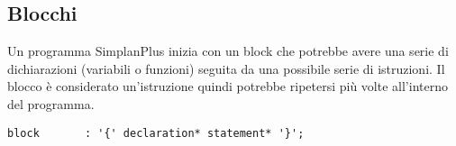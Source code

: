\documentclass[../../main]{subfiles}
\begin{document}
\subsection{Blocchi}\label{s:blocchi}
Un programma SimplanPlus inizia con un block che potrebbe avere una serie di dichiarazioni (variabili o funzioni) seguita da una possibile serie di istruzioni. 
Il blocco è considerato un'istruzione quindi potrebbe ripetersi più volte all'interno del programma.

\begin{lstlisting}[style=antlr]
    block       : '{' declaration* statement* '}';
    \end{lstlisting}
\end{document}
